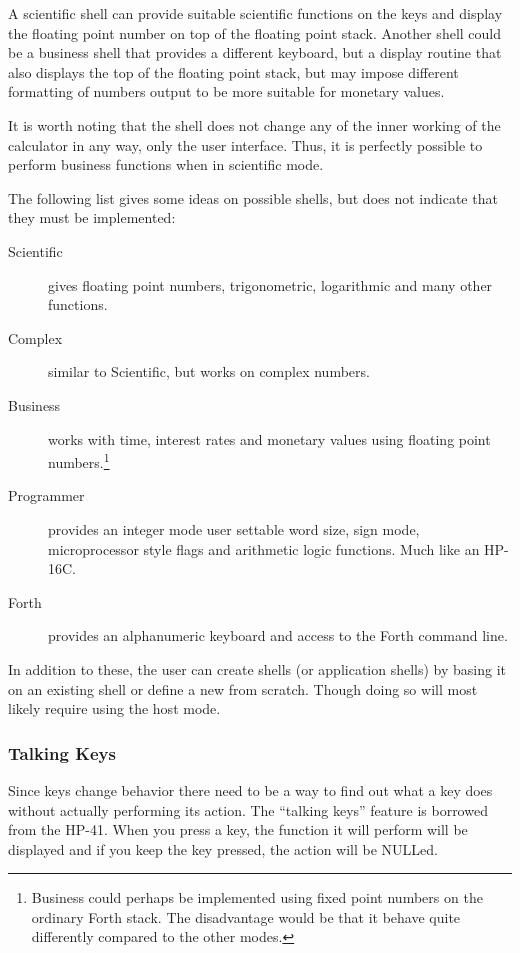 \documentclass[a4paper]{article}
\begin{document}
A scientific shell can provide suitable scientific functions on the keys and display the floating point number on top of the floating point stack. Another shell could be a business shell that provides a different keyboard, but a display routine that also displays the top of the floating point stack, but may impose different formatting of numbers output to be more suitable for monetary values.

It is worth noting that the shell does not change any of the inner working of the calculator in any way, only  the user interface. Thus, it is perfectly possible to perform business functions when in scientific mode.

The following list gives some ideas on possible shells, but does not indicate that they must be implemented:
\begin{description}
\item[Scientific] gives floating point numbers, trigonometric, logarithmic and many other functions.
\item[Complex] similar to Scientific, but works on complex numbers.
\item[Business] works with time, interest rates and monetary values using floating point numbers.\footnote{Business could perhaps be implemented using fixed point numbers on the ordinary Forth stack. The disadvantage would be that it behave quite differently compared to the other modes.}
\item[Programmer] provides an integer mode user settable word size, sign mode, microprocessor style flags and arithmetic logic functions. Much like an HP-16C.
\item[Forth] provides an alphanumeric keyboard and access to the Forth command line.
\end{description}

In addition to these, the user can create shells (or application shells) by basing it on an existing shell or define a new from scratch. Though doing so will most likely require using the host mode.

\subsubsection{Talking Keys}
Since keys change behavior there need to be a way to find out what a key does without actually performing its action. The ``talking keys'' feature is borrowed from the HP-41. When you press a key, the function it will perform will be displayed and if you keep the key pressed, the action will be NULLed.
\end{document}
